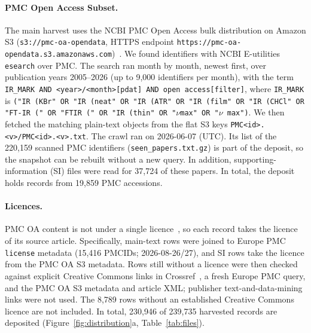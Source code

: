 \documentclass[pdflatex,sn-nature]{sn-jnl}
\begin{document}
\paragraph{PMC Open Access Subset.}
The main harvest uses the NCBI PMC Open Access bulk distribution on Amazon S3
(\texttt{s3://pmc-oa-opendata}, HTTPS endpoint
\texttt{https://pmc-oa-opendata.s3.amazonaws.com})~\citep{pmc_oa}.
We found identifiers with NCBI E-utilities \texttt{esearch} over PMC.
The search ran month by month, newest first, over publication years 2005--2026 (up to
9,000 identifiers per month), with the term
\texttt{IR\_MARK AND <year>/<month>[pdat] AND open access[filter]}, where
\texttt{IR\_MARK} is
\texttt{("IR (KBr" OR "IR (neat" OR "IR (ATR" OR "IR (film" OR "IR (CHCl" OR
"FT-IR (" OR "FTIR (" OR "IR (thin" OR "$\nu$max" OR "$\nu$ max")}.
We then fetched the matching plain-text objects from the flat S3 keys
\texttt{PMC<id>.<v>/PMC<id>.<v>.txt}.
The crawl ran on 2026-06-07 (UTC).
Its list of the 220,159 scanned PMC identifiers (\texttt{seen\_papers.txt.gz}) is part
of the deposit, so the snapshot can be rebuilt without a new query.
In addition, supporting-information (SI) files were read for 37,724 of these papers.
In total, the deposit holds records from 19,859 PMC accessions.

\paragraph{Licences.}
PMC OA content is not under a single licence~\citep{pmc_oa}, so each record takes the
licence of its source article.
Specifically, main-text rows were joined to Europe PMC~\citep{rosonovski2024europepmc}
\texttt{license} metadata (15,416 PMCIDs; 2026-08-26/27), and SI rows take the licence
from the PMC OA S3 metadata.
Rows still without a licence were then checked against explicit Creative Commons links in
Crossref~\citep{kemp2022crossref}, a fresh Europe PMC query, and the PMC OA S3 metadata
and article XML; publisher text-and-data-mining links were not used.
The 8,789 rows without an established Creative Commons licence are not included.
In total, 230,946 of 239,735 harvested records are deposited (Figure~\ref{fig:distribution}a,
Table~\ref{tab:files}).
\end{document}
